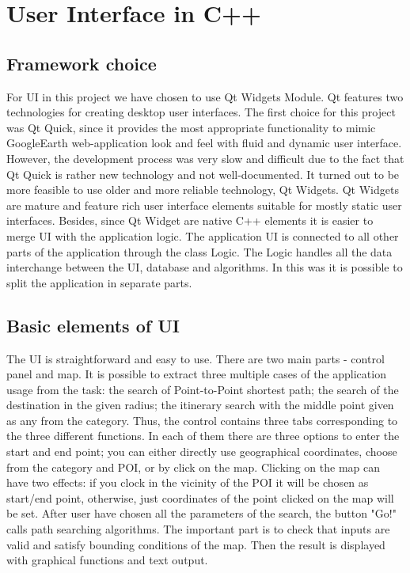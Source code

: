 \documentclass[reqno,openany,12pt]{amsbook}
\theoremstyle{definition}
\theoremstyle{remark}
\begin{document}
\section{User Interface in C++}
\subsection{Framework choice}

For UI in this project we have chosen to use Qt Widgets Module. Qt features two technologies for creating desktop user interfaces. The first choice for this project was Qt Quick, since it provides the most appropriate functionality to mimic GoogleEarth web-application look and feel with fluid and dynamic user interface. However, the development process was very slow and difficult due to the fact that Qt Quick is rather new technology and not well-documented. It turned out to be more feasible to use older and more reliable technology, Qt Widgets. Qt Widgets are mature and feature rich user interface elements suitable for mostly static user interfaces. Besides, since Qt Widget are native C++ elements it is easier to merge UI with the application logic.
The application UI is connected to all other parts of the application through the class Logic.  The Logic handles all the data interchange between the UI, database and algorithms. In this was it is possible to split the application in separate parts. 

\subsection{Basic elements of UI}

The UI is straightforward and easy to use. There are two main parts - control panel and map. It is possible to extract three multiple cases of the application usage from the task: the search of Point-to-Point shortest path; the search of the destination in the given radius; the itinerary search with the middle point given as any from the category. Thus, the control contains three tabs corresponding to the three different functions. In each of them there are three options to enter the start and end point; you can either directly use geographical coordinates, choose from the category and POI, or by click on the map. Clicking on the map can have two effects: if you clock in the vicinity of the POI it will be chosen as start/end point, otherwise, just coordinates of the point clicked on the map will be set.
After user have chosen all the parameters of the search, the button "Go!" calls path searching algorithms. The important part is to check that inputs are valid and satisfy bounding conditions of the map. Then the result is displayed with graphical functions and text output.
\end{document}
